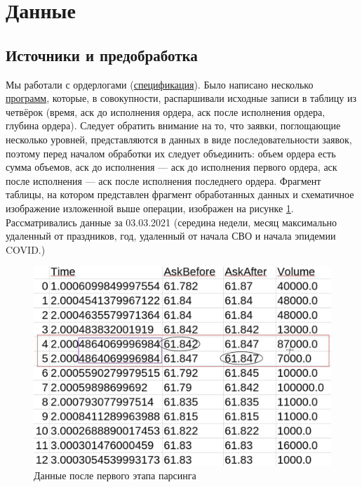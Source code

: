 \section{Данные}
\subsection{Источники и предобработка}
Мы работали с ордерлогами (\href{https://fs.moex.com/f/3198/specifikacija-formata-dannyh.pdf}{спецификация}). Было написано несколько 
\href{https://github.com/VsevolodZaostrovsky/OWModel/tree/main/New%20data/data%20preparing}{программ},
которые, в совокупности, распаршивали исходные записи в таблицу из четвёрок (время, аск до исполнения ордера, аск после исполнения ордера, глубина ордера). 
Следует обратить внимание на то, что заявки, поглощающие несколько уровней, представляются в данных в виде последовательности заявок, поэтому 
перед началом обработки их следует объединить: объем ордера есть сумма объемов, аск до исполнения --- аск до исполнения первого ордера,
аск после исполнения --- аск после исполнения последнего ордера. Фрагмент таблицы, на котором представлен фрагмент обработанных данных
и схематичное изображение изложенной выше операции, изображен на рисунке \ref{datacsv}.
 Рассматривались данные за 
03.03.2021 (середина недели, месяц максимально удаленный от праздников, 
год, удаленный от начала СВО и начала эпидемии COVID.)
\begin{figure}
    \includegraphics[scale=0.35]{fig/datscsv.jpg}
    \caption{Данные после первого этапа парсинга}
    \label{datacsv}
\end{figure}

